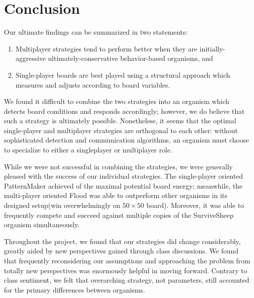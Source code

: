 \section{Conclusion}
\label{sec:conclusion}
Our ultimate findings can be summarized in two statements:

\begin{enumerate}
\item Multiplayer strategies tend to perform better when they are initially-aggressive ultimately-conservative behavior-based organisms, and
\item Single-player boards are best played using a structural approach which measures and adjusts according to board variables.
\end{enumerate}

We found it difficult to combine the two strategies into an organism which detects board conditions and responds accordingly; however, we do believe that such a strategy is ultimately possible.  Nonetheless, it seems that the optimal single-player and multiplayer strategies are orthogonal to each other: without sophisticated detection and communication algorithms, an organism must choose to specialize to either a singleplayer or multiplayer role.

While we were not successful in combining the strategies, we were generally pleased with the success of our individual strategies.  The single-player oriented PatternMaker achieved  of the maximal potential board energy; meanwhile, the multi-player oriented Flood was able to outperform other organisms in its designed setup(win overwhelmingly on $50\times 50$ board). Moreover, it was able to frequently compete and succeed against multiple copies of the SurviveSheep organism simultaneously.

Throughout the project, we found that our strategies did change considerably, greatly aided by new perspectives gained through class discussions.  We found that frequently reconsidering our assumptions and approaching the problem from totally new perspectives was enormously helpful in moving forward.  Contrary to class sentiment, we felt that overarching strategy, not parameters, still accounted for the primary differences between organisms. 